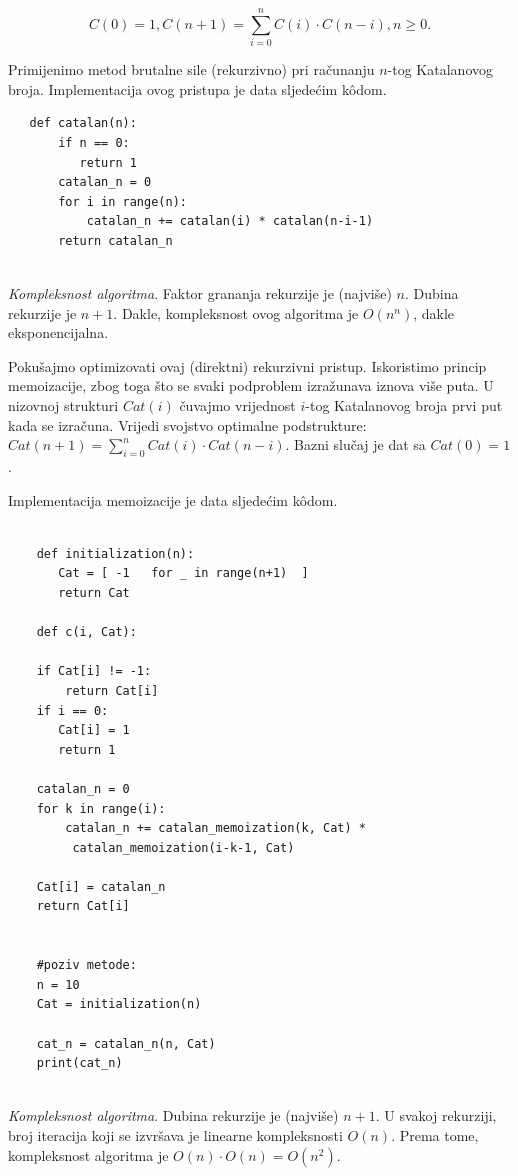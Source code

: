  $$C(0) = 1, C(n+1) = \sum_{i=0}^{n} C(i) \cdot C(n-i), n \geq  0.$$
 
 Primijenimo metod brutalne sile (rekurzivno) pri računanju $n$-tog Katalanovog broja. Implementacija ovog pristupa je data sljedećim k\^odom. 
 
 \begin{verbatim}
   def catalan(n):
       if n == 0:
          return 1
       catalan_n = 0 
       for i in range(n): 
           catalan_n += catalan(i) * catalan(n-i-1) 
       return catalan_n
        
 \end{verbatim}
  
  \emph{Kompleksnost algoritma}. Faktor grananja rekurzije je (najviše) $n$. Dubina rekurzije je $n+1$. Dakle, kompleksnost ovog algoritma je $O(n^n)$, dakle eksponencijalna. 

Pokušajmo optimizovati ovaj (direktni) rekurzivni pristup. Iskoristimo princip memoizacije, zbog toga što se svaki podproblem izražunava iznova više puta. U nizovnoj strukturi $Cat(i)$ čuvajmo vrijednost $i$-tog Katalanovog broja prvi put kada se izračuna.  Vrijedi svojstvo optimalne podstrukture: $Cat(n+1) = \sum_{i=0}^{n} Cat(i) \cdot Cat(n-i).$ Bazni slučaj je dat sa $Cat(0) =1$.

Implementacija memoizacije je data sljedećim k\^odom.

  \begin{verbatim}
	
	def initialization(n):
	   Cat = [ -1   for _ in range(n+1)  ] 
	   return Cat 
	
	def c(i, Cat): 
	
	if Cat[i] != -1:
	    return Cat[i]
	if i == 0: 
	   Cat[i] = 1
	   return 1 
     
    catalan_n = 0
    for k in range(i): 
        catalan_n += catalan_memoization(k, Cat) *
         catalan_memoization(i-k-1, Cat)
    
    Cat[i] = catalan_n
    return Cat[i]
    
	   
	#poziv metode:
	n = 10
	Cat = initialization(n) 
	
	cat_n = catalan_n(n, Cat) 
	print(cat_n)
	
\end{verbatim}  

\emph{Kompleksnost algoritma}. Dubina rekurzije je (najviše) $n+1$. U svakoj rekurziji, broj iteracija koji se izvršava je linearne kompleksnosti $O(n)$. Prema tome, kompleksnost algoritma je $O(n) \cdot O(n) = O(n^2)$. 



